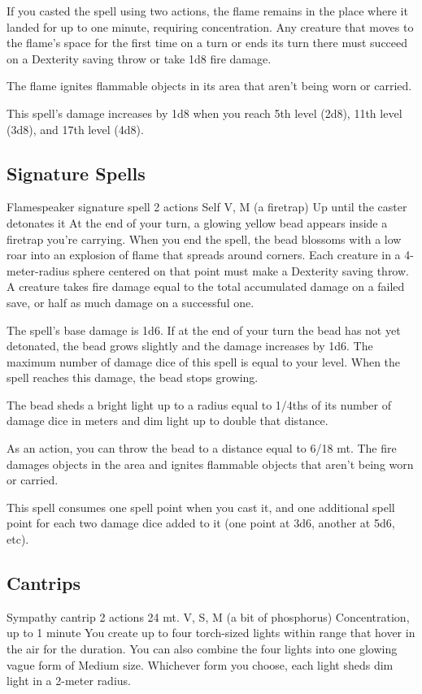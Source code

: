         If you casted the spell using two actions, the flame remains in the place where it landed for up to one minute, requiring concentration.
        Any creature that moves to the flame's space for the first time on a turn or ends its turn there must succeed on a Dexterity saving throw or take 1d8 fire damage.

        The flame ignites flammable objects in its area that aren't being worn or carried.

        This spell's damage increases by 1d8 when you reach 5th level (2d8), 11th level (3d8), and 17th level (4d8).
\subsection*{Signature Spells}
        {Flamespeaker signature spell}
        {2 actions}
        {Self}
        {V, M (a firetrap)}
        {Up until the caster detonates it}
        At the end of your turn, a glowing yellow bead appears inside a firetrap you're carrying.
        When you end the spell, the bead blossoms with a low roar into an explosion of flame that spreads around corners.
        Each creature in a 4-meter-radius sphere centered on that point must make a Dexterity saving throw.
        A creature takes fire damage equal to the total accumulated damage on a failed save, or half as much damage on a successful one.

        The spell's base damage is 1d6.
        If at the end of your turn the bead has not yet detonated, the bead grows slightly and the damage increases by 1d6.
        The maximum number of damage dice of this spell is equal to your level.
        When the spell reaches this damage, the bead stops growing.

        The bead sheds a bright light up to a radius equal to 1/4ths of its number of damage dice in meters and dim light up to double that distance.

        As an action, you can throw the bead to a distance equal to 6/18 mt.
        The fire damages objects in the area and ignites flammable objects that aren't being worn or carried.

        This spell consumes one spell point when you cast it, and one additional spell point for each two damage dice added to it (one point at 3d6, another at 5d6, etc).
\subsection*{Cantrips}
        {Sympathy cantrip}
        {2 actions}
        {24 mt.}
        {V, S, M (a bit of phosphorus)}
        {Concentration, up to 1 minute}
        You create up to four torch-sized lights within range that hover in the air for the duration.
        You can also combine the four lights into one glowing vague form of Medium size.
        Whichever form you choose, each light sheds dim light in a 2-meter radius.

